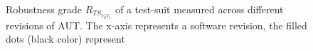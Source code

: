 \begin{figure}[ht!]
\captionsetup{justification=justified,
singlelinecheck=false}
\vspace{-2mm}
\vspace{-2mm}
\caption{Robustness grade $R_{TS_{V_{0}V_{1}}}$ of a test-suit measured across different revisions of AUT. The x-axis represents a software revision, the filled dots (black color) represent }
\label{fig:robustnessplots}
\end{figure} 